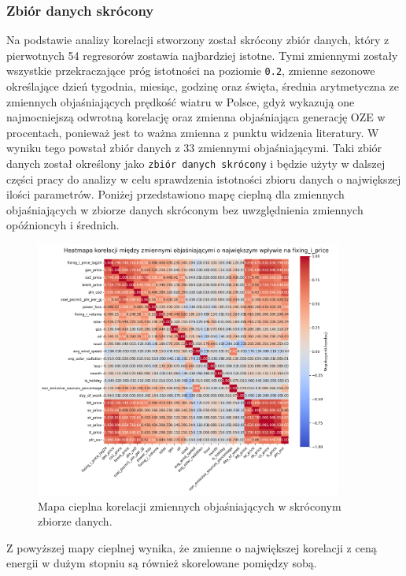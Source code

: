 \subsubsection{Zbiór danych skrócony}
\label{sec:shortened_dataset}
Na podstawie analizy korelacji stworzony został skrócony zbiór danych, który z pierwotnych 54 regresorów zostawia najbardziej istotne. Tymi zmiennymi zostały wszystkie przekraczające próg istotności na poziomie \texttt{0.2}, zmienne sezonowe określające dzień tygodnia, miesiąc, godzinę oraz święta, średnia arytmetyczna ze zmiennych objaśniających prędkość wiatru w Polsce, gdyż wykazują one najmocniejszą odwrotną korelację oraz zmienna objaśniająca generację OZE w procentach, ponieważ jest to ważna zmienna z punktu widzenia literatury. W wyniku tego powstał zbiór danych z 33 zmiennymi objaśniającymi. Taki zbiór danych został określony jako \texttt{zbiór danych skrócony} i będzie użyty w dalszej części pracy do analizy w celu sprawdzenia istotności zbioru danych o największej ilości parametrów. Poniżej przedstawiono mapę cieplną dla zmiennych objaśniających w zbiorze danych skróconym bez uwzględnienia zmiennych opóźnioncyh i średnich. 

\begin{figure}[H]
    \centering
    \includegraphics[width=0.9\textwidth]{../plots/heatmap_short_db_features.png}
    \caption{Mapa cieplna korelacji zmiennych objaśniających w skróconym zbiorze danych.}
    \label{fig:heatmap_shortened_dataset}
\end{figure}

Z powyższej mapy cieplnej wynika, że zmienne o największej korelacji z ceną energii w dużym stopniu są również skorelowane pomiędzy sobą. 

